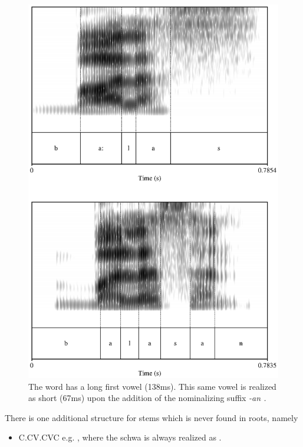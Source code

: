 \begin{figure}
 \centering
 \includegraphics{pics/baalasbalasan.eps}
 \caption[Absence of vowel lengthening after derivation]{The word  has a long first vowel (138ms). This same vowel is realized as short (67ms) upon the addition of the nominalizing suffix \em -an \em.}
 \label{fig:baalasbalasan}
\end{figure}



There is one additional structure for stems which is never found in roots, namely

\begin{itemize}
 \item C\E.CV.CVC e.g. , where the schwa is always realized as .
\end{itemize}

